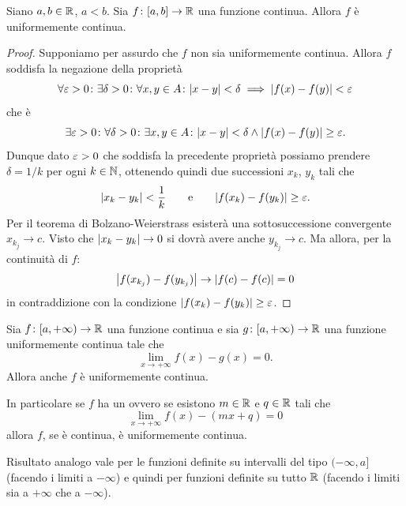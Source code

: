 \begin{theorem}
\mymark{***}
Siano $a,b\in \mathbb R$, $a<b$.
Sia $f\colon [a,b]\to \mathbb R$ una funzione continua.
Allora $f$ è uniformemente continua.
\end{theorem}
%
\begin{proof}
\mymark{***}
Supponiamo per assurdo che $f$ non sia uniformemente continua. Allora
$f$ soddisfa la negazione della proprietà
\[
 \forall \varepsilon>0\colon \exists \delta > 0 \colon
 \forall x,y\in A \colon {\left|x-y\right|} < \delta \implies {\left|f(x)-f(y)\right|} < \varepsilon
\]
che è
\[
 \exists \varepsilon>0\colon \forall \delta > 0 \colon
 \exists x,y \in A \colon {\left|x-y\right|} < \delta \land {\left|f(x)-f(y)\right|} \ge \varepsilon.
\]
Dunque dato $\varepsilon>0$ che soddisfa la precedente proprietà possiamo
prendere $\delta=1/k$
per ogni $k\in \mathbb N$, ottenendo quindi due successioni $x_k$, $y_k$ tali che
\[
  {\left|x_k-y_k\right|} < \frac 1 k \qquad\text{e}\qquad {\left|f(x_k) - f(y_k)\right|} \ge \varepsilon.
\]
Per il teorema di Bolzano-Weierstrass esisterà una sottosuccessione convergente $x_{k_j} \to c$.
Visto che ${\left|x_k-y_k\right|}\to 0$ si dovrà avere anche $y_{k_j}\to c$.
Ma allora, per la continuità di $f$:
\[
 {\left|f(x_{k_j})-f(y_{k_j})\right|} \to {\left|f(c) - f(c)\right|} = 0
\]
in contraddizione con la condizione ${\left|f(x_k)-f(y_k)\right|}\ge \varepsilon$.
\end{proof}

\begin{theorem}
Sia $f\colon [a,+\infty) \to \mathbb R$ una funzione continua e sia $g\colon [a,+\infty) \to \mathbb R$ una funzione uniformemente continua tale che
\[
  \lim_{x\to +\infty} f(x) - g(x) = 0.
\]
Allora anche $f$ è uniformemente continua.

In particolare se $f$ ha un  ovvero se esistono $m\in \mathbb R$ e $q\in \mathbb R$ tali che
\[
  \lim_{x\to +\infty} f(x) - (mx + q)  = 0
\]
allora $f$, se è continua, è uniformemente continua.

Risultato analogo vale per le funzioni definite su intervalli del tipo $(-\infty,a]$ (facendo i limiti a $-\infty$) e quindi per funzioni definite su tutto $\mathbb R$ (facendo i limiti sia a $+\infty$ che a $-\infty$).
\end{theorem}


